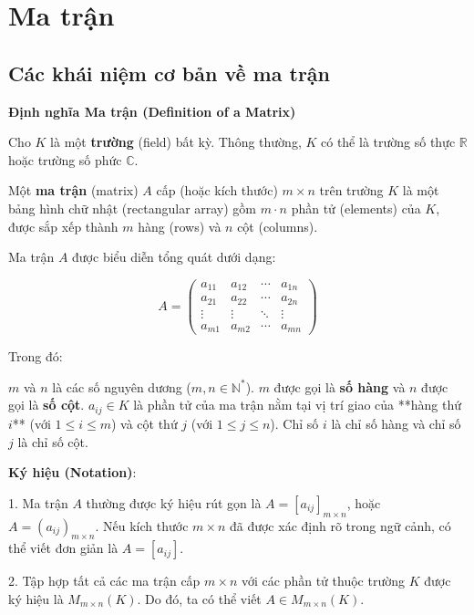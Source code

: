 
\chapter{Ma trận}

\section{Các khái niệm cơ bản về ma trận}
\textbf{Định nghĩa Ma trận (Definition of a Matrix)}

Cho $K$ là một \textbf{trường} (field) bất kỳ. Thông thường, $K$ có thể là trường số thực $\mathbb{R}$ hoặc trường số phức $\mathbb{C}$.

Một \textbf{ma trận} (matrix) $A$ cấp (hoặc kích thước) $m \times n$ trên trường $K$ là một bảng hình chữ nhật (rectangular array) gồm $m \cdot n$ phần tử (elements) của $K$, được sắp xếp thành $m$ hàng (rows) và $n$ cột (columns).

Ma trận $A$ được biểu diễn tổng quát dưới dạng:

$$
A =
\begin{pmatrix}
a_{11} & a_{12} & \cdots & a_{1n} \\
a_{21} & a_{22} & \cdots & a_{2n} \\
\vdots & \vdots & \ddots & \vdots \\
a_{m1} & a_{m2} & \cdots & a_{mn}
\end{pmatrix}
$$

Trong đó:

$m$ và $n$ là các số nguyên dương ($m, n \in \mathbb{N}^*$). $m$ được gọi là \textbf{số hàng} và $n$ được gọi là \textbf{số cột}. $a_{ij} \in K$ là phần tử của ma trận nằm tại vị trí giao của **hàng thứ $i$** (với $1 \le i \le m$) và cột thứ $j$ (với $1 \le j \le n$). Chỉ số $i$ là chỉ số hàng và chỉ số $j$ là chỉ số cột.

\textbf{Ký hiệu (Notation)}:


1.  Ma trận $A$ thường được ký hiệu rút gọn là $A = [a_{ij}]_{m \times n}$, hoặc $A = (a_{ij})_{m \times n}$. Nếu kích thước $m \times n$ đã được xác định rõ trong ngữ cảnh, có thể viết đơn giản là $A = [a_{ij}]$.


2.  Tập hợp tất cả các ma trận cấp $m \times n$ với các phần tử thuộc trường $K$ được ký hiệu là $M_{m \times n}(K)$. Do đó, ta có thể viết $A \in M_{m \times n}(K)$.


